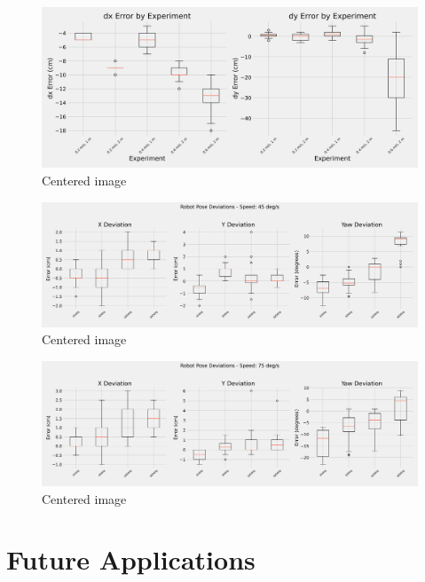 \documentclass[a4paper, 12pt]{article}
\begin{document}
    \begin{figure}[ht]
        \centering
        \includegraphics[width=0.99\linewidth]{images/experiment_results/linear_error_boxplots.png}
        \caption{Centered image}
    \end{figure}
    \begin{figure}[ht]
        \centering
        \includegraphics[width=0.99\linewidth]{images/experiment_results/rotational_errors_speed_45.png}
        \caption{Centered image}
    \end{figure}
    \begin{figure}[ht]
        \centering
        \includegraphics[width=0.99\linewidth]{images/experiment_results/rotational_errors_speed_75.png}
        \caption{Centered image}
    \end{figure}

    \pagebreak

    \section{Future Applications}
\end{document}
